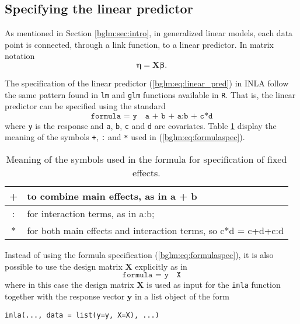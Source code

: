 \documentclass[a4paper,11pt]{report}
\def\bs#1{\ensuremath{\boldsymbol{#1}}} %
\begin{document}
\subsection{Specifying the linear predictor}

As mentioned in Section \ref{bglm:sec:intro}, in generalized linear
models, each data point is connected, through a link function, to a
linear predictor. In matrix notation
\begin{equation}
    \bs{\eta} = \bs{X}\bs{\beta}.
    \label{bglm:eq:linear_pred}
\end{equation}

The specification of the linear predictor (\ref{bglm:eq:linear_pred})
in INLA follow the same pattern found in \texttt{lm} and \texttt{glm}
functions available in \texttt{R}.  That is, the linear predictor can
be specified using the standard
\begin{equation}
    \texttt{formula = y ~ a + b + a:b + c*d}
    \label{bglm:eq:formulaspec}
\end{equation}
where \texttt{y} is the response and \texttt{a}, \texttt{b},
\texttt{c} and \texttt{d} are covariates.  Table
\ref{bglm:tab:lmsymbols} display the meaning of the symbols
\texttt{+}, \texttt{:} and \texttt{*} used in
(\ref{bglm:eq:formulaspec}).

\begin{table}[ht!]
    \centering
    \begin{tabular}{|c|l|}
        \hline
        + & to combine main effects, as in a + b \\
        \hline
        : & for interaction terms, as in a:b; \\
        \hline
        * & for both main effects and interaction terms, so c*d = c+d+c:d \\
        \hline
    \end{tabular}
    \caption{Meaning of the symbols used in the formula for specification of fixed effects.}
    \label{bglm:tab:lmsymbols}
\end{table}

Instead of using the formula specification
(\ref{bglm:eq:formulaspec}), it is also possible to use the design
matrix $\bs{X}$ explicitly as in
\begin{equation}
    \texttt{formula = y ~ X}
    \label{bglm:eq:designspec}
\end{equation}
where in this case the design matrix $\bs{X}$ is used as input for the 
\texttt{inla} function together with the response vector $\bs{y}$ in 
a list object of the form
\begin{center}
    \texttt{inla(..., data = list(y=y, X=X), ...)}
\end{center}
\end{document}
